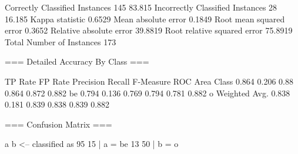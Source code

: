 Correctly Classified Instances         145               83.815  %
Incorrectly Classified Instances        28               16.185  %
Kappa statistic                          0.6529
Mean absolute error                      0.1849
Root mean squared error                  0.3652
Relative absolute error                 39.8819 %
Root relative squared error             75.8919 %
Total Number of Instances              173     

=== Detailed Accuracy By Class ===

               TP Rate   FP Rate   Precision   Recall  F-Measure   ROC Area  Class
                 0.864     0.206      0.88      0.864     0.872      0.882    be
                 0.794     0.136      0.769     0.794     0.781      0.882    o
Weighted Avg.    0.838     0.181      0.839     0.838     0.839      0.882

=== Confusion Matrix ===

  a  b   <-- classified as
 95 15 |  a = be
 13 50 |  b = o
